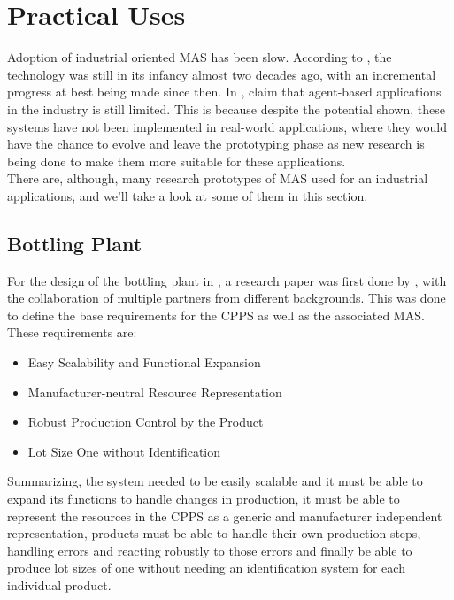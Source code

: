 \section{Practical Uses}
\label{sec:practical_uses}

Adoption of industrial oriented MAS has been slow. According to \citeauthor{karnouskos02} \cite{karnouskos02}, the technology was still in its infancy almost two decades ago, with an incremental progress at best being made since then. In \cite{Karnouskos2019}, \citeauthor{Karnouskos2019} claim that agent-based applications in the industry is still limited. This is because despite the potential shown, these systems have not been implemented in real-world applications, where they would have the chance to evolve and leave the prototyping phase as new research is being done to make them more suitable for these applications.\\

There are, although, many research prototypes of MAS used for an industrial applications, and we'll take a look at some of them in this section.

\subsection{Bottling Plant}
\label{subsec:bottling_plant}

For the design of the bottling plant in \cite{bottling_plant_part2}, a research paper \cite{bottling_plant_part1} was first done by \citeauthor{bottling_plant_part1}, with the collaboration of multiple partners from different backgrounds. This was done to define the base requirements for the CPPS as well as the associated MAS. These requirements are:

\begin{itemize}
	\item Easy Scalability and Functional Expansion
	\item Manufacturer-neutral Resource Representation
	\item Robust Production Control by the Product
	\item Lot Size One without Identification
\end{itemize}

Summarizing, the system needed to be easily scalable and it must be able to expand its functions to handle changes in production, it must be able to represent the resources in the CPPS as a generic and manufacturer independent representation, products must be able to handle their own production steps, handling errors and reacting robustly to those errors and finally be able to produce lot sizes of one without needing an identification system for each individual product. 

